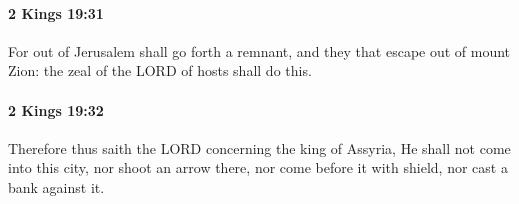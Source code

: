 		\paragraph{2 Kings 19:31} %
			\label{2KINGS-19-31}

			For out of Jerusalem shall go forth a remnant, and they that escape out of mount Zion: the zeal of the LORD of hosts shall do this.


		\paragraph{2 Kings 19:32} %
			\label{2KINGS-19-32}

			Therefore thus saith the LORD concerning the king of Assyria, He shall not come into this city, nor shoot an arrow there, nor come before it with shield, nor cast a bank against it.


